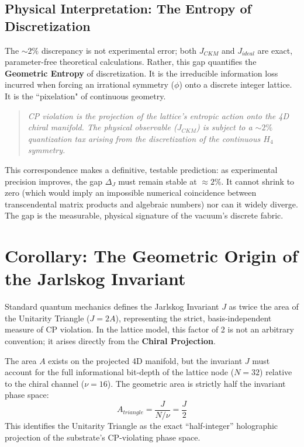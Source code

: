 \subsection{Physical Interpretation: The Entropy of Discretization}

The $\sim 2\%$ discrepancy is not experimental error; both $J_{CKM}$ and $J_{ideal}$ are exact, parameter-free theoretical calculations. Rather, this gap quantifies the \textbf{Geometric Entropy} of discretization. It is the irreducible information loss incurred when forcing an irrational symmetry ($\phi$) onto a discrete integer lattice. It is the ``pixelation" of continuous geometry.

\begin{quote}
    \textit{CP violation is the projection of the lattice's entropic action onto the 4D chiral manifold. The physical observable ($J_{CKM}$) is subject to a $\sim 2\%$ quantization tax arising from the discretization of the continuous $H_4$ symmetry.}
\end{quote}

This correspondence makes a definitive, testable prediction: as experimental precision improves, the gap $\Delta_J$ must remain stable at $\approx 2\%$. It cannot shrink to zero (which would imply an impossible numerical coincidence between transcendental matrix products and algebraic numbers) nor can it widely diverge. The gap is the measurable, physical signature of the vacuum's discrete fabric.













\section{Corollary: The Geometric Origin of the Jarlskog Invariant}

Standard quantum mechanics defines the Jarlskog Invariant $J$ as twice the area of the Unitarity Triangle ($J = 2A$), representing the strict, basis-independent measure of CP violation. In the lattice model, this factor of 2 is not an arbitrary convention; it arises directly from the \textbf{Chiral Projection}. 

The area $A$ exists on the projected 4D manifold, but the invariant $J$ must account for the full informational bit-depth of the lattice node ($N=32$) relative to the chiral channel ($\nu=16$). The geometric area is strictly half the invariant phase space:
\begin{equation}
    A_{triangle} = \frac{J}{N/\nu} = \frac{J}{2}
\end{equation}
This identifies the Unitarity Triangle as the exact ``half-integer'' holographic projection of the substrate's CP-violating phase space.
